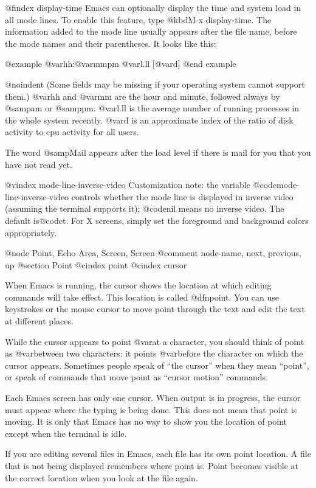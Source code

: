 {{@findex display-time
  Emacs can optionally display the time and system load in all mode lines.
To enable this feature, type @kbd{M-x display-time}.  The information added
to the mode line usually appears after the file name, before the mode names
and their parentheses.  It looks like this:

@example
@var{hh}:@var{mm}pm @var{l.ll} [@var{d}]
@end example

@noindent
(Some fields may be missing if your operating system cannot support them.)
@var{hh} and @var{mm} are the hour and minute, followed always by @samp{am}
or @samp{pm}.  @var{l.ll} is the average number of running processes in the
whole system recently.  @var{d} is an approximate index of the ratio of
disk activity to cpu activity for all users.

The word @samp{Mail} appears after the load level if there is mail for
you that you have not read yet.

@vindex mode-line-inverse-video
  Customization note: the variable @code{mode-line-inverse-video}
controls whether the mode line is displayed in inverse video (assuming
the terminal supports it); @code{nil} means no inverse video.  The
default is@code{t}.  For X screens, simply set the foreground and
background colors appropriately.
  

@node Point, Echo Area, Screen, Screen
@comment  node-name,  next,  previous,  up
@section Point
@cindex point
@cindex cursor

  When Emacs is running, the cursor shows the location at which editing
commands will take effect.  This location is called @dfn{point}.  You
can use keystrokes or the mouse cursor to move point through the text
and edit the text at different places.

  While the cursor appears to point @var{at} a character, you should
think of point as @var{between} two characters: it points @var{before}
the character on which the cursor appears.  Sometimes people speak
of ``the cursor'' when they mean ``point'', or speak of commands that
move point as ``cursor motion'' commands.

 Each Emacs screen has only one cursor.  When output is in progress, the cursor
must appear where the typing is being done.  This does not mean that
point is moving.  It is only that Emacs has no way to show you the
location of point except when the terminal is idle.

  If you are editing several files in Emacs, each file has its own point
location.  A file that is not being displayed remembers where point is.
Point becomes visible at the correct location when you look at the file again.

}}
